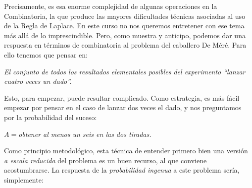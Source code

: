 Precisamente, es esa enorme complejidad de algunas operaciones en la Combinatoria, la que produce las mayores dificultades técnicas asociadas al uso de la Regla de Laplace. En este curso no nos queremos entretener con ese tema más allá de lo imprescindible. Pero, como muestra y anticipo, podemos dar una respuesta en términos de combinatoria al problema del caballero De Méré.  Para ello tenemos que pensar en:
    \begin{center}
    \begin{minipage}{11cm}
      {\sf\em El conjunto de todos los resultados elementales posibles del experimento ``lanzar cuatro veces un dado''.}
    \end{minipage}
    \end{center}
Esto, para empezar, puede resultar complicado. Como estrategia, es más fácil empezar por pensar en el caso de lanzar dos veces el dado, y nos preguntamos por la probabilidad del suceso:
    \begin{center}
    \begin{minipage}{11cm}
      {\sf  $A=${\em obtener al menos un seis en las dos tiradas.} }
    \end{minipage}
    \end{center}
Como principio metodológico, esta técnica de entender primero bien una versión {\em a escala reducida} del problema es un buen recurso, al que conviene acostumbrarse. La respuesta de la {\em probabilidad ingenua} a este problema sería, simplemente:

